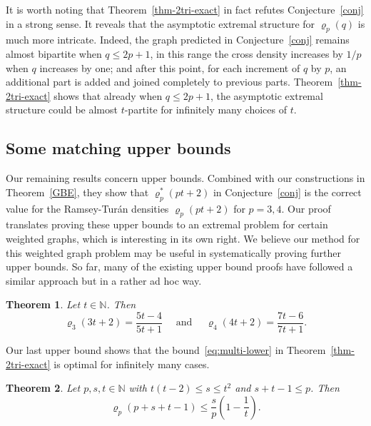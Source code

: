 \documentclass[10pt,a4paper]{article}
\newtheorem{theorem}{Theorem}[section]
\theoremstyle{definition}
\begin{document}
It is worth noting that Theorem~\ref{thm-2tri-exact} in fact refutes Conjecture~\ref{conj} in a strong sense. It reveals that the asymptotic extremal structure for $\varrho_p(q)$ is much more intricate. Indeed, the graph predicted in Conjecture~\ref{conj} remains almost bipartite when $q\le 2p+1$, in this range the cross density increases by $1/p$ when $q$ increases by one; and after this point, for each increment of $q$ by $p$, an additional part is added and joined completely to previous parts. Theorem~\ref{thm-2tri-exact} shows that already when $q\le 2p+1$, the asymptotic extremal structure could be almost $t$-partite for infinitely many choices of $t$.



\subsection{Some matching upper bounds}
Our remaining results concern upper bounds. Combined with our constructions in Theorem~\ref{GBE}, they show that $\varrho_p^*(pt+2)$ in Conjecture~\ref{conj} is the correct value for the Ramsey-Tur\'an densities $\varrho_p(pt+2)$ for $p=3,4$. Our proof translates proving these upper bounds to an extremal problem for certain weighted graphs, which is interesting in its own right. We believe our method for this weighted graph problem may be useful in systematically proving further upper bounds. So far, many of the existing upper bound proofs have followed a similar approach but in a rather ad hoc way.



\begin{theorem}\label{thm-upper-main}
	Let $t\in\mathbb{N}$. Then
	$$\varrho_3(3t+2)=\frac{5t-4}{5t+1} \quad \mbox{ and }\quad \varrho_4(4t+2)=\frac{7t-6}{7t+1}.$$
\end{theorem}






Our last upper bound shows that the bound~\eqref{eq:multi-lower} in Theorem~\ref{thm-2tri-exact} is optimal for infinitely many cases.

\begin{theorem}\label{thm-upper-easy}
	Let $p,s,t\in\mathbb{N}$ with $t(t-2) \leq s \leq t^2$ and $s+t-1 \leq p$.
	Then 
	$$\varrho_p(p+s+t-1) \leq \frac{s}{p}\left(1-\frac{1}{t}\right).$$
\end{theorem}

\end{document}
